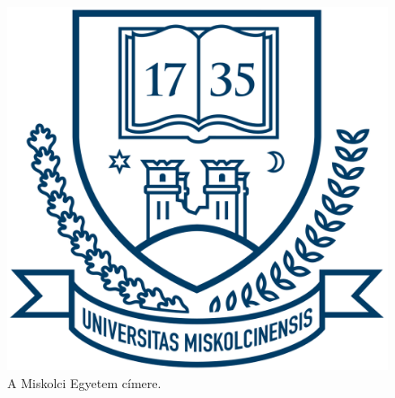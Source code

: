 
\begin{figure}[h]
	\centering
	\includegraphics[scale=0.3]{images/me_logo.png}
	\caption{A Miskolci Egyetem címere.}
	\label{fig:cimer}
\end{figure}
